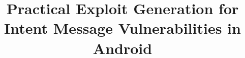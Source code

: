 \documentclass[conference]{acm_proc_article-sp}
\newcommand{\titled}{Practical Exploit Generation for Intent Message Vulnerabilities in Android}
\begin{document}
\title{\titled}



\end{document}
